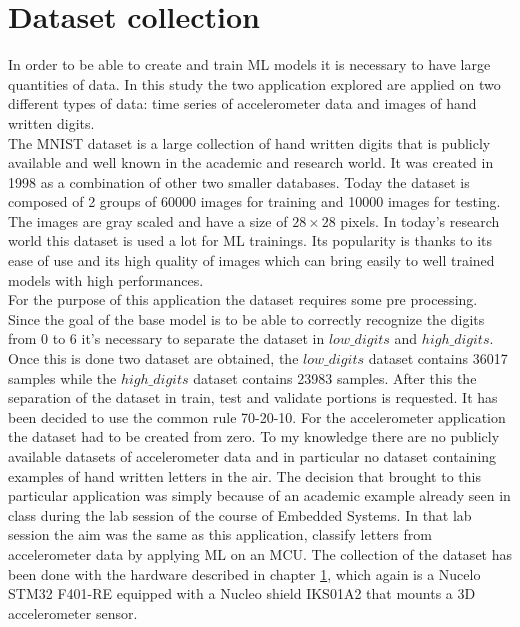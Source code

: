 \documentclass[12pt]{report}
\begin{document}
\section{Dataset collection}

In order to be able to create and train ML models it is necessary to have large quantities of data. In this study the two application explored are applied on two different types of data: time series of accelerometer data and images of hand written digits. \\
The MNIST dataset is a large collection of hand written digits that is publicly available and well known in the academic and research world. It was created in 1998 as a combination of other two smaller databases. Today the dataset is composed of 2 groups of 60000 images for training and 10000 images for testing. The images are gray scaled and have a size of $28 \times 28$ pixels. In today's research world this dataset is used a lot for ML trainings. Its popularity is thanks to its ease of use and its high quality of images which can bring easily to well trained models with high performances.\\
For the purpose of this application the dataset requires some pre processing. Since the goal of the base model is to be able to correctly recognize the digits from 0 to 6 it's necessary to separate the dataset in $low\_digits$ and $high\_digits$. Once this is done two dataset are obtained, the $low\_digits$ dataset contains 36017 samples while the $high\_digits$ dataset contains 23983 samples. After this the separation of the dataset in train, test and validate portions is requested. It has been decided to use the common rule 70-20-10. 
\bigskip
For the accelerometer application the dataset had to be created from zero. To my knowledge there are no publicly available datasets of accelerometer data and in particular no dataset containing examples of hand written letters in the air. The decision that brought to this particular application was simply because of an academic example already seen in class during the lab session of the course of Embedded Systems. In that lab session the aim was the same as this application, classify letters from accelerometer data by applying ML on an MCU. The collection of the dataset has been done with the hardware described in chapter \ref{}, which again is a Nucelo STM32 F401-RE equipped with a Nucleo shield IKS01A2 that mounts a 3D accelerometer sensor. \\
\end{document}

